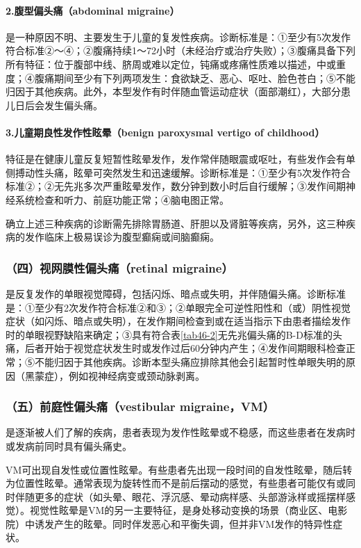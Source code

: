 \paragraph{2.腹型偏头痛（abdominal migraine）}

是一种原因不明、主要发生于儿童的复发性疾病。诊断标准是：①至少有5次发作符合标准②～④；②腹痛持续1～72小时（未经治疗或治疗失败）；③腹痛具备下列所有特征：位于腹部中线、脐周或难以定位，钝痛或疼痛性质难以描述，中或重度；④腹痛期间至少有下列两项发生：食欲缺乏、恶心、呕吐、脸色苍白；⑤不能归因于其他疾病。此外，本型发作有时伴随血管运动症状（面部潮红），大部分患儿日后会发生偏头痛。

\paragraph{3.儿童期良性发作性眩晕（benign paroxysmal vertigo of childhood）}

特征是在健康儿童反复短暂性眩晕发作，发作常伴随眼震或呕吐，有些发作会有单侧搏动性头痛，眩晕可突然发生和迅速缓解。诊断标准是：①至少有5次发作符合标准②；②无先兆多次严重眩晕发作，数分钟到数小时后自行缓解；③发作间期神经系统检查和听力、前庭功能正常；④脑电图正常。

确立上述三种疾病的诊断需先排除胃肠道、肝胆以及肾脏等疾病，另外，这三种疾病的发作临床上极易误诊为腹型癫痫或间脑癫痫。

\subsubsection{（四）视网膜性偏头痛（retinal migraine）}

是反复发作的单眼视觉障碍，包括闪烁、暗点或失明，并伴随偏头痛。诊断标准是：①至少有2次发作符合标准②和③；②单眼完全可逆性阳性和（或）阴性视觉症状（如闪烁、暗点或失明），在发作期间检查到或在适当指示下由患者描绘发作时的单眼视野缺陷来确定；③具有符合表\ref{tab46-2}无先兆偏头痛的B-D标准的头痛，后者开始于视觉症状发生时或发作过后60分钟内产生；④发作间期眼科检查正常；⑤不能归因于其他疾病。诊断本型头痛应排除其他会引起暂时性单眼失明的原因（黑蒙症），例如视神经病变或颈动脉剥离。

\subsubsection{（五）前庭性偏头痛（vestibular migraine，VM）}

是逐渐被人们了解的疾病，患者表现为发作性眩晕或不稳感，而这些患者在发病时或发病前同时具有偏头痛史。

VM可出现自发性或位置性眩晕。有些患者先出现一段时间的自发性眩晕，随后转为位置性眩晕。通常表现为旋转性而不是前后摆动的感觉，有些患者可能仅有或同时伴随更多的症状（如头晕、眼花、浮沉感、晕动病样感、头部游泳样或摇摆样感觉）。视觉性眩晕是VM的另一主要特征，是身处移动变换的场景（商业区、电影院）中诱发产生的眩晕。同时伴发恶心和平衡失调，但并非VM发作的特异性症状。

